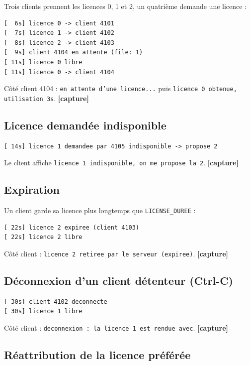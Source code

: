 \documentclass[11pt,a4paper]{article}
\newcommand{\code}[1]{\texttt{#1}}
\begin{document}
Trois clients prennent les licences 0, 1 et 2, un quatrième demande une licence :

\begin{lstlisting}
[  6s] licence 0 -> client 4101
[  7s] licence 1 -> client 4102
[  8s] licence 2 -> client 4103
[  9s] client 4104 en attente (file: 1)
[ 11s] licence 0 libre
[ 11s] licence 0 -> client 4104
\end{lstlisting}

Côté client 4104 : \code{en attente d'une licence...} puis \code{licence 0 obtenue, utilisation 3s}. \textbf{[capture]}

\subsection{Licence demandée indisponible}

\begin{lstlisting}
[ 14s] licence 1 demandee par 4105 indisponible -> propose 2
\end{lstlisting}

Le client affiche \code{licence 1 indisponible, on me propose la 2}. \textbf{[capture]}

\subsection{Expiration}

Un client garde sa licence plus longtemps que \code{LICENSE\_DUREE} :

\begin{lstlisting}
[ 22s] licence 2 expiree (client 4103)
[ 22s] licence 2 libre
\end{lstlisting}

Côté client : \code{licence 2 retiree par le serveur (expiree)}. \textbf{[capture]}

\subsection{Déconnexion d'un client détenteur (Ctrl-C)}

\begin{lstlisting}
[ 30s] client 4102 deconnecte
[ 30s] licence 1 libre
\end{lstlisting}

Côté client : \code{deconnexion : la licence 1 est rendue avec}. \textbf{[capture]}

\subsection{Réattribution de la licence préférée}
\end{document}
